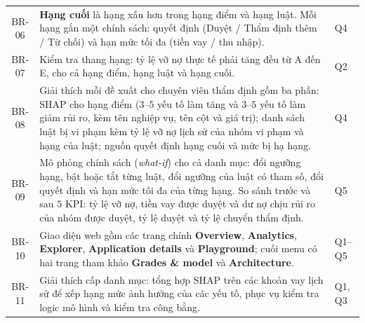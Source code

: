 \begin{table}[H]
\begin{tabular}{c p{13cm} l}
		BR-06       & \textbf{Hạng cuối} là hạng xấu hơn trong hạng điểm và hạng luật. Mỗi hạng gắn một chính sách: quyết định (Duyệt / Thẩm định thêm / Từ chối) và hạn mức tối đa (tiền vay / thu nhập).                                                                                                                                             & Q4               \\
		BR-07       & Kiểm tra thang hạng: tỷ lệ vỡ nợ thực tế phải tăng đều từ A đến E, cho cả hạng điểm, hạng luật và hạng cuối.                                                                                                                                                                                                                     & Q2               \\
		BR-08       & Giải thích mỗi đề xuất cho chuyên viên thẩm định gồm ba phần: SHAP cho hạng điểm ($3$--$5$ yếu tố làm tăng và $3$--$5$ yếu tố làm giảm rủi ro, kèm tên nghiệp vụ, tên cột và giá trị); danh sách luật bị vi phạm kèm tỷ lệ vỡ nợ lịch sử của nhóm vi phạm và hạng của luật; nguồn quyết định hạng cuối và mức bị hạ hạng.        & Q4               \\
		BR-09       & Mô phỏng chính sách (\textit{what-if}) cho cả danh mục: đổi ngưỡng hạng, bật hoặc tắt từng luật, đổi ngưỡng của luật có tham số, đổi quyết định và hạn mức tối đa của từng hạng. So sánh trước và sau $5$ KPI: tỷ lệ vỡ nợ, tiền vay được duyệt và dư nợ chịu rủi ro của nhóm được duyệt, tỷ lệ duyệt và tỷ lệ chuyển thẩm định. & Q5               \\
		BR-10       & Giao diện web gồm các trang chính \textbf{Overview}, \textbf{Analytics}, \textbf{Explorer}, \textbf{Application details} và \textbf{Playground}; cuối menu có hai trang tham khảo \textbf{Grades \& model} và \textbf{Architecture}.                                                                                             & Q1--Q5           \\
		BR-11       & Giải thích cấp danh mục: tổng hợp SHAP trên các khoản vay lịch sử để xếp hạng mức ảnh hưởng của các yếu tố, phục vụ kiểm tra logic mô hình và kiểm tra công bằng.                                                                                                                                                                & Q1, Q3           \\
		\bottomrule
	\end{tabular}
\end{table}

